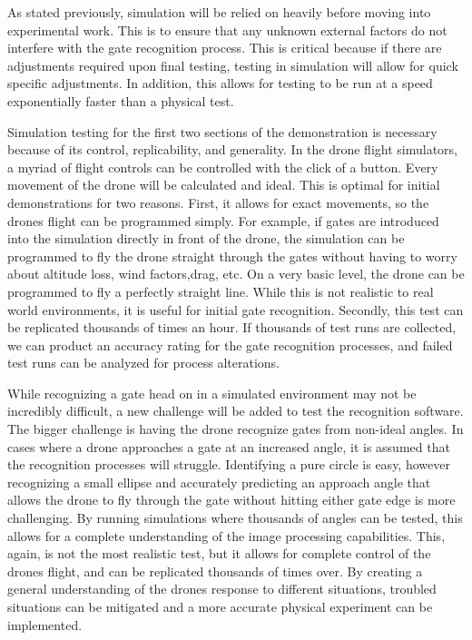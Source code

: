 \documentclass[onecolumn,10pt]{IEEEtran}
\begin{document}
As stated previously, simulation will be relied on heavily before moving into experimental work. This is to ensure that any unknown external factors do not interfere with the gate recognition process. This is critical because if there are adjustments required upon final testing, testing in simulation will allow for quick specific adjustments. In addition, this allows for testing to be run at a speed exponentially faster than a physical test.

Simulation testing for the first two sections of the demonstration is necessary because of its control, replicability, and generality. In the drone flight simulators, a myriad of flight controls can be controlled with the click of a button. Every movement of the drone will be calculated and ideal. This is optimal for initial demonstrations for two reasons. First, it allows for exact movements, so the drones flight can be programmed simply. For example, if gates are introduced into the simulation directly in front of the drone, the simulation can be programmed to fly the drone straight through the gates without having to worry about altitude loss, wind factors,drag, etc. On a very basic level, the drone can be programmed to fly a perfectly straight line. While this is not realistic to real world environments, it is useful for initial gate recognition. Secondly, this test can be replicated thousands of times an hour. If thousands of test runs are collected, we can product an accuracy rating for the gate recognition processes, and failed test runs can be analyzed for process alterations.

While recognizing a gate head on in a simulated environment may not be incredibly difficult, a new challenge will be added to test the recognition software. The bigger challenge is having the drone recognize gates from non-ideal angles. In cases where a drone approaches a gate at an increased angle, it is assumed that the recognition processes will struggle. Identifying a pure circle is easy, however recognizing a small ellipse and accurately predicting an approach angle that allows the drone to fly through the gate without hitting either gate edge is more challenging. By running simulations where thousands of angles can be tested, this allows for a complete understanding of the image processing capabilities. This, again, is not the most realistic test, but it allows for complete control of the drones flight, and can be replicated thousands of times over. By creating a general understanding of the drones response to different situations, troubled situations can be mitigated and a more accurate physical experiment can be implemented.
\end{document}
